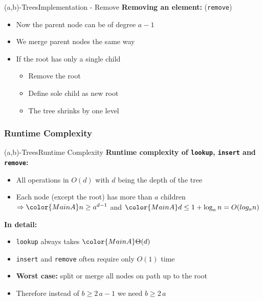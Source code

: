\begin{frame}{(a,b)-Trees}{Implementation - Remove}
  \textbf{Removing an element:} (\texttt{\color{MainA}remove})
  \begin{itemize}
    \item<2->
      Now the parent node can be of degree {\color{MainA}$a-1$}
    \item<3->
      We {\color{MainA}merge} parent nodes the same way
    \item<4->
      If the root has only a single child
      \begin{itemize}
        \item
          Remove the root
        \item
          Define sole child as new root
        \item
          The tree shrinks by one level
      \end{itemize}
  \end{itemize}
\end{frame}


\subsubsection{Runtime Complexity}

\begin{frame}{(a,b)-Trees}{Runtime Complexity}
  \textbf{Runtime complexity of \texttt{\color{MainA}lookup},
    \texttt{\color{MainA}insert} and \texttt{\color{MainA}remove}:}
  \begin{itemize}
    \item<2->
      All operations in {\color{MainA}$O(d)$} with
      {\color{MainA}$d$} being the depth of the tree
    \item<3->
      Each node (except the root) has {\color{MainA}more than $a$
      children}\\
      \begin{math}
        \Rightarrow
        \color{MainA}
        n \geq a^{d-1}
      \end{math}
      and
      \begin{math}
        \color{MainA}
        d \leq 1 + \log_a n = O(log_a n)
      \end{math}
  \end{itemize}
  \vspace{1em}
  \textbf{In detail:}
  \begin{itemize}
    \item<5->
      \texttt{\color{MainA}lookup} always takes $\color{MainA}\Theta(d)$
    \item<6->
      \texttt{\color{MainA}insert} and
      \texttt{\color{MainA}remove}
      often require only {\color{MainA}$O(1)$} time
    \item<7->
      \textbf{Worst case:} {\color{MainA}split} or
      {\color{MainA}merge} all nodes on path up to the root
    \item<8->
      Therefore instead of {\color{MainA}$b \geq 2 \, a - 1$}
      we need {\color{MainA}$b \geq 2 \, a$}
  \end{itemize}
\end{frame}

